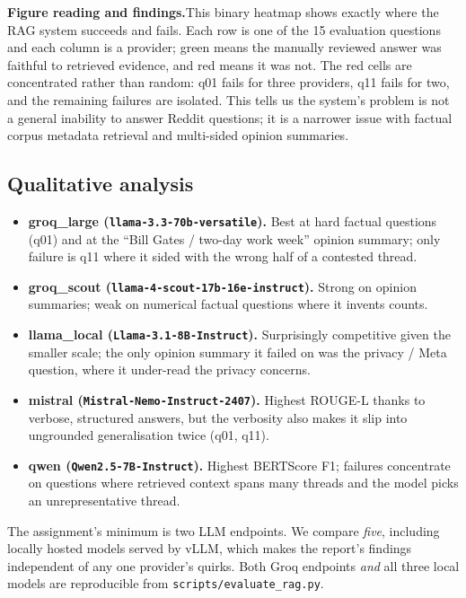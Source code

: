 \documentclass[11pt,a4paper]{article}
\newenvironment{extrabox}{%
  \par\medskip\noindent
  \def\FrameCommand{\fboxsep=6pt\fboxrule=0.6pt%
    \fcolorbox{extraboxrule}{extraboxbg}}%
  \MakeFramed{\advance\hsize-2\fboxsep\FrameRestore}%
  \noindent{\sffamily\bfseries\color{extraboxrule}Extra step.}\quad\ignorespaces%
}{\endMakeFramed\par\medskip}
\newcommand{\figureexplanation}[1]{%
  \par\smallskip\noindent\textbf{Figure reading and findings.}\quad #1\par\medskip%
}
\begin{document}
\figureexplanation{This binary heatmap shows exactly where the RAG system succeeds and fails. Each
row is one of the 15 evaluation questions and each column is a provider; green means the manually
reviewed answer was faithful to retrieved evidence, and red means it was not. The red cells are
concentrated rather than random: q01 fails for three providers, q11 fails for two, and the
remaining failures are isolated. This tells us the system's problem is not a general inability to
answer Reddit questions; it is a narrower issue with factual corpus metadata retrieval and
multi-sided opinion summaries.}

\subsection{Qualitative analysis}
\begin{itemize}
  \item \textbf{groq\_large (\texttt{llama-3.3-70b-versatile}).} Best at hard factual questions
        (q01) and at the ``Bill Gates / two-day work week'' opinion summary; only failure is q11
        where it sided with the wrong half of a contested thread.
  \item \textbf{groq\_scout (\texttt{llama-4-scout-17b-16e-instruct}).} Strong on opinion
        summaries; weak on numerical factual questions where it invents counts.
  \item \textbf{llama\_local (\texttt{Llama-3.1-8B-Instruct}).} Surprisingly competitive given the
        smaller scale; the only opinion summary it failed on was the privacy / Meta question, where
        it under-read the privacy concerns.
  \item \textbf{mistral (\texttt{Mistral-Nemo-Instruct-2407}).} Highest ROUGE-L thanks to verbose,
        structured answers, but the verbosity also makes it slip into ungrounded generalisation
        twice (q01, q11).
  \item \textbf{qwen (\texttt{Qwen2.5-7B-Instruct}).} Highest BERTScore F1; failures concentrate on
        questions where retrieved context spans many threads and the model picks an unrepresentative
        thread.
\end{itemize}

\begin{extrabox}
The assignment's minimum is two LLM endpoints. We compare \emph{five}, including locally hosted
models served by vLLM, which makes the report's findings independent of any one provider's
quirks. Both Groq endpoints \emph{and} all three local models are reproducible from
\texttt{scripts/evaluate\_rag.py}.
\end{extrabox}
\end{document}
